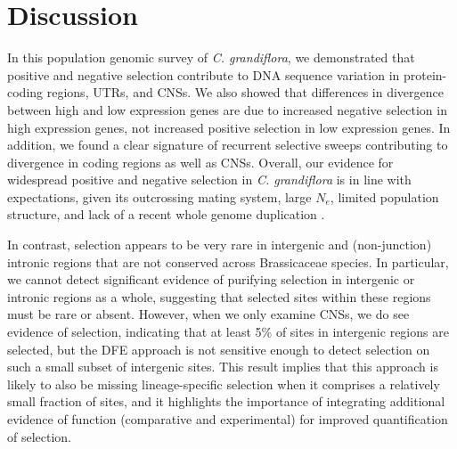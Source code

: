 \section{Discussion}
In this population genomic survey of \textit{C. grandiflora}, we demonstrated that positive and negative selection contribute to DNA sequence variation in protein-coding regions, UTRs, and CNSs. We also showed that differences in divergence between high and low expression genes are due to increased negative selection in high expression genes, not increased positive selection in low expression genes. In addition, we found a clear signature of recurrent selective sweeps contributing to divergence in coding regions as well as CNSs. Overall, our evidence for widespread positive and negative selection in \textit{C. grandiflora} is in line with expectations, given its outcrossing mating system, large $N_{e}$, limited population structure, and lack of a recent whole genome duplication \citep{hough2013}.

In contrast, selection appears to be very rare in intergenic and (non-junction) intronic regions that are not conserved across Brassicaceae species. In particular, we cannot detect significant evidence of purifying selection in intergenic or intronic regions as a whole, suggesting that selected sites within these regions must be rare or absent. However, when we only examine CNSs, we do see evidence of selection, indicating that at least 5\% of sites in intergenic regions are selected, but the DFE approach is not sensitive enough to detect selection on such a small subset of intergenic sites. This result implies that this approach is likely to also be missing lineage-specific selection when it comprises a relatively small fraction of sites, and it highlights the importance of integrating additional evidence of function (comparative and experimental) for improved quantification of selection.

